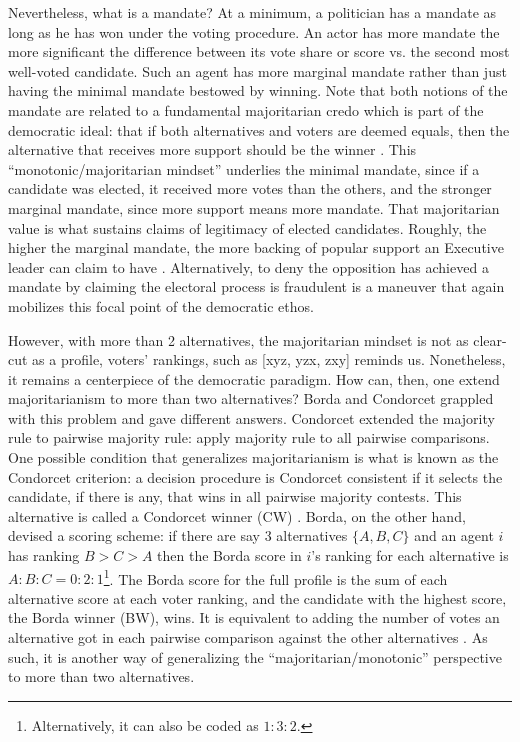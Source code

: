 \documentclass[hidelinks,11pt]{article}
\begin{document}
Nevertheless, what is a mandate? At a minimum, a politician has a mandate as
long as he has won under the voting procedure. An actor has more mandate the
more significant the difference between its vote share or score vs. the second
most well-voted candidate. Such an agent has more marginal mandate rather than
just having the minimal mandate bestowed by winning. Note that both notions of
the mandate are related to a fundamental majoritarian credo which is part of the
democratic ideal: that if both alternatives and voters are deemed equals, then
the alternative that receives more support should be the winner
\parencite{dahl1989democracy}. This ``monotonic/majoritarian mindset'' underlies
the minimal mandate, since if a candidate was elected, it received more votes
than the others, and the stronger marginal mandate, since more support means
more mandate. That majoritarian value is what sustains claims of legitimacy of
elected candidates. Roughly, the higher the marginal mandate, the more backing
of popular support an Executive leader can claim to have
\parencite{grossman2022majoritarian}. Alternatively, to deny the opposition has
achieved a mandate by claiming the electoral process is fraudulent is a maneuver
that again mobilizes this focal point of the democratic ethos.

However, with more than 2 alternatives, the majoritarian mindset is not as
clear-cut as a profile, voters' rankings, such as [xyz, yzx, zxy] reminds us.
Nonetheless, it remains a centerpiece of the democratic paradigm. How can, then,
one extend majoritarianism to more than two alternatives? Borda and Condorcet
grappled with this problem and gave different answers. Condorcet extended the
majority rule to pairwise majority rule: apply majority rule to all pairwise
comparisons. One possible condition that generalizes majoritarianism is what is
known as the Condorcet criterion: a decision procedure is Condorcet consistent
if it selects the candidate, if there is any, that wins in all pairwise majority
contests. This alternative is called a Condorcet winner (CW)
\parencite{felsenthal2011review}. Borda, on the other hand, devised a scoring
scheme: if there are say 3 alternatives \(\{A,B,C\}\) and an agent \(i\) has
ranking \(B>C>A\) then the Borda score in \(i\)'s ranking for each alternative
is \(A:B:C = 0:2:1\)\footnote{Alternatively, it can also be coded as
  \(1:3:2\).}. The Borda score for the full profile is the sum of each
alternative score at each voter ranking, and the candidate with the highest
score, the Borda winner (BW), wins. It is equivalent to adding the number of
votes an alternative got in each pairwise comparison against the other
alternatives \parencite{nurmi1999voting}. As such, it is another way of
generalizing the ``majoritarian/monotonic'' perspective to more than two
alternatives.
\end{document}
